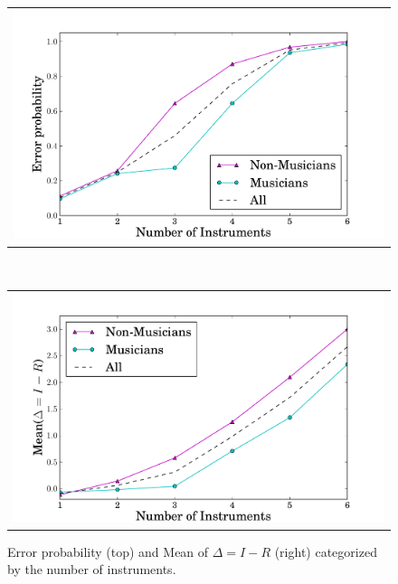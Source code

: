 \begin{figure}[h]
\centering
\begin{minipage}{0.8\textwidth}
\begin{tabular}{c}
	\includegraphics[width=\textwidth]{Chapters/07_Analysis_Experiment/images/error_means.pdf}
\end{tabular}
\end{minipage}
\\
\begin{minipage}{0.8\textwidth}
\begin{tabular}{c}
	\includegraphics[width=\textwidth]{Chapters/07_Analysis_Experiment/images/error_diff.pdf}
\end{tabular}
\end{minipage}
\caption{Error probability (top) and Mean of $\Delta = I-R$ (right) categorized by the number of instruments.}
\label{fig:meanerror}
\end{figure}

